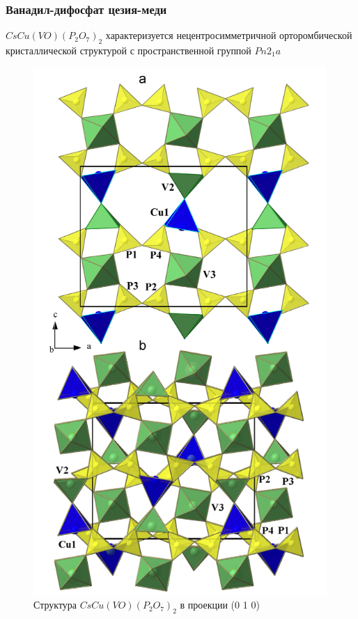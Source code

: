 \documentclass[11pt]{article}
\begin{document}
\subsubsection{Ванадил-дифосфат цезия-меди}
$CsCu(VO)(P_2O_7)_2$ характеризуется нецентросимметричной орторомбической кристаллической структурой с пространственной группой $Pn2_1a$ ~\cite{shvanskaya2015}

\begin{figure}[htp]
\centering
\includegraphics[scale=0.7]{CsCuVOP2O72_1}
\caption {Структура $CsCu(VO)(P_2O_7)_2$ в проекции (0 1 0) ~\cite{shvanskaya2015}}
\label{}
\end{figure}
\end{document}
